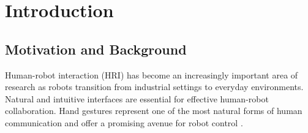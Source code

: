 \documentclass[12pt]{article}
\begin{document}
\thispagestyle{empty}
\maketitle
\setcounter{page}{0}

\newpage
\begin{abstract}
\large This report presents the design, implementation, and evaluation of a real-time hand gesture recognition system that controls a five-fingered humanoid robotic hand using computer vision. The system employs Google's MediaPipe Hands framework for accurate hand landmark detection and tracking, a web-based interface utilizing the Web Serial API for communication, and an ESP32 microcontroller for servo motor control. The primary objective is to create an intuitive human-robot interaction platform that mirrors human hand movements in real-time. The system demonstrates successful gesture recognition with adaptive calibration capabilities, achieving responsive control of individual finger movements. Key contributions include the integration of browser-based computer vision with embedded hardware control, implementation of an adaptive normalization algorithm for personalized gesture recognition, and a modular architecture supporting future extensions. The project demonstrates practical applications in teleoperation, rehabilitation robotics, and human-computer interaction research.
\end{abstract}

\newpage

\tableofcontents 

\newpage
\section{Introduction}

\subsection{Motivation and Background}

Human-robot interaction (HRI) has become an increasingly important area of research as robots transition from industrial settings to everyday environments. Natural and intuitive interfaces are essential for effective human-robot collaboration. Hand gestures represent one of the most natural forms of human communication and offer a promising avenue for robot control \cite{hri_survey}.
\end{document}
